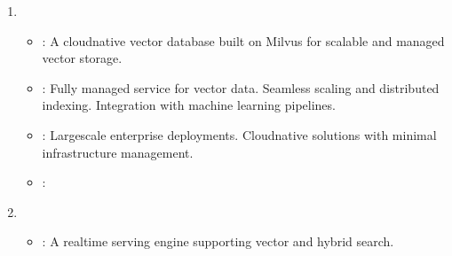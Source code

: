 \documentclass[letterpaper,11pt,english]{sphinxmanual}
\begin{document}
\begin{enumerate}
\begin{itemize}
\item {} 
\sphinxAtStartPar
{}:
\sphinxhyphen{} Combines vector search with traditional key\sphinxhyphen{}value storage.
\sphinxhyphen{} Supports hybrid search and metadata filtering.
\sphinxhyphen{} High throughput and low latency due to in\sphinxhyphen{}memory architecture.

\item {} 
\sphinxAtStartPar
{}:
\sphinxhyphen{} Applications requiring real\sphinxhyphen{}time, low\sphinxhyphen{}latency search.
\sphinxhyphen{} Integrating vector search with existing Redis\sphinxhyphen{}based systems.

\item {} 
\sphinxAtStartPar
{}: 

\end{itemize}

\item {} 
\sphinxAtStartPar
{}
\begin{itemize}
\item {} 
\sphinxAtStartPar
{}:
\sphinxhyphen{} A cloud\sphinxhyphen{}native vector database built on Milvus for scalable and managed vector storage.

\item {} 
\sphinxAtStartPar
{}:
\sphinxhyphen{} Fully managed service for vector data.
\sphinxhyphen{} Seamless scaling and distributed indexing.
\sphinxhyphen{} Integration with machine learning pipelines.

\item {} 
\sphinxAtStartPar
{}:
\sphinxhyphen{} Large\sphinxhyphen{}scale enterprise deployments.
\sphinxhyphen{} Cloud\sphinxhyphen{}native solutions with minimal infrastructure management.

\item {} 
\sphinxAtStartPar
{}: 

\end{itemize}

\item {} 
\sphinxAtStartPar
{}
\begin{itemize}
\item {} 
\sphinxAtStartPar
{}:
\sphinxhyphen{} A real\sphinxhyphen{}time serving engine supporting vector and hybrid search.


\end{itemize}
\end{enumerate}
\end{document}

